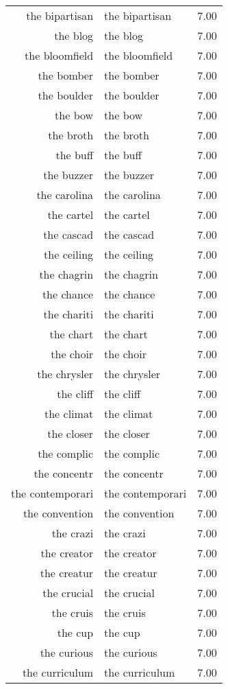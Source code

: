\begin{table}[ht]
\begin{tabular}{rlr}
  the bipartisan & the bipartisan & 7.00 \\ 
  the blog & the blog & 7.00 \\ 
  the bloomfield & the bloomfield & 7.00 \\ 
  the bomber & the bomber & 7.00 \\ 
  the boulder & the boulder & 7.00 \\ 
  the bow & the bow & 7.00 \\ 
  the broth & the broth & 7.00 \\ 
  the buff & the buff & 7.00 \\ 
  the buzzer & the buzzer & 7.00 \\ 
  the carolina & the carolina & 7.00 \\ 
  the cartel & the cartel & 7.00 \\ 
  the cascad & the cascad & 7.00 \\ 
  the ceiling & the ceiling & 7.00 \\ 
  the chagrin & the chagrin & 7.00 \\ 
  the chance & the chance & 7.00 \\ 
  the chariti & the chariti & 7.00 \\ 
  the chart & the chart & 7.00 \\ 
  the choir & the choir & 7.00 \\ 
  the chrysler & the chrysler & 7.00 \\ 
  the cliff & the cliff & 7.00 \\ 
  the climat & the climat & 7.00 \\ 
  the closer & the closer & 7.00 \\ 
  the complic & the complic & 7.00 \\ 
  the concentr & the concentr & 7.00 \\ 
  the contemporari & the contemporari & 7.00 \\ 
  the convention & the convention & 7.00 \\ 
  the crazi & the crazi & 7.00 \\ 
  the creator & the creator & 7.00 \\ 
  the creatur & the creatur & 7.00 \\ 
  the crucial & the crucial & 7.00 \\ 
  the cruis & the cruis & 7.00 \\ 
  the cup & the cup & 7.00 \\ 
  the curious & the curious & 7.00 \\ 
  the curriculum & the curriculum & 7.00 \\ 

\end{tabular}
\end{table}
